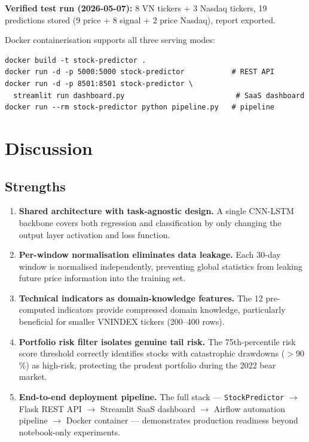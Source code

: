 \documentclass[12pt,a4paper]{article}
\begin{document}
\textbf{Verified test run (2026-05-07):} 8 VN tickers + 3 Nasdaq tickers,
19 predictions stored (9 price + 8 signal + 2 price Nasdaq), report exported.

Docker containerisation supports all three serving modes:

\begin{lstlisting}[style=bash]
docker build -t stock-predictor .
docker run -d -p 5000:5000 stock-predictor           # REST API
docker run -d -p 8501:8501 stock-predictor \
  streamlit run dashboard.py                          # SaaS dashboard
docker run --rm stock-predictor python pipeline.py   # pipeline
\end{lstlisting}

\section{Discussion}

\subsection{Strengths}

\begin{enumerate}[leftmargin=2em]
  \item \textbf{Shared architecture with task-agnostic design.}
        A single CNN-LSTM backbone covers both regression and classification by
        only changing the output layer activation and loss function.

  \item \textbf{Per-window normalisation eliminates data leakage.}
        Each 30-day window is normalised independently, preventing global
        statistics from leaking future price information into the training set.

  \item \textbf{Technical indicators as domain-knowledge features.}
        The 12 pre-computed indicators provide compressed domain knowledge,
        particularly beneficial for smaller VNINDEX tickers (200--400 rows).

  \item \textbf{Portfolio risk filter isolates genuine tail risk.}
        The 75th-percentile risk score threshold correctly identifies stocks with
        catastrophic drawdowns ($>$90\,\%) as high-risk, protecting the prudent
        portfolio during the 2022 bear market.

  \item \textbf{End-to-end deployment pipeline.}
        The full stack --- \texttt{StockPredictor} $\to$ Flask REST API $\to$
        Streamlit SaaS dashboard $\to$ Airflow automation pipeline $\to$ Docker
        container --- demonstrates production readiness beyond notebook-only
        experiments.
\end{enumerate}
\end{document}
